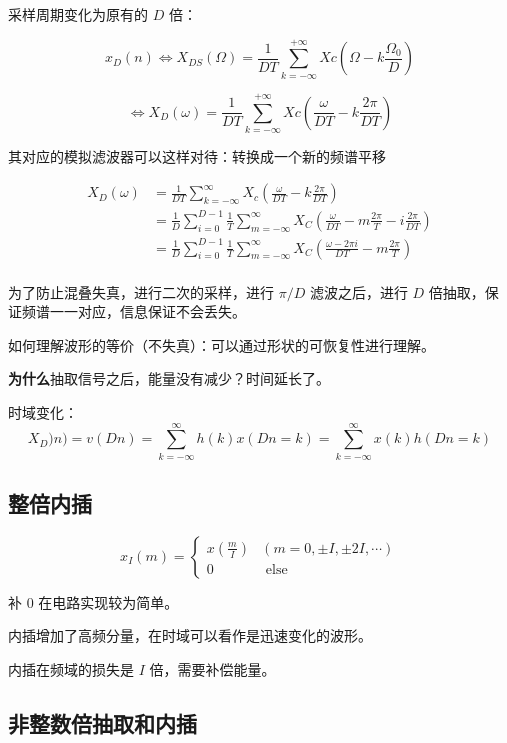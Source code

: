 \documentclass[cn,11pt,chinese,black,simple]{../elegantbook}
\begin{document}
采样周期变化为原有的 \(D\) 倍：

\[x_{D}(n) \Leftrightarrow X_{D S}(\Omega)=\frac{1}{D T} \sum_{k=-\infty}^{+\infty} X c\left(\Omega-k \frac{\Omega_{0}}{D}\right) \] 

\[\Leftrightarrow X_{D}(\omega)=\frac{1}{D T} \sum_{k=-\infty}^{+\infty} X c\left(\frac{\omega}{D T}-k \frac{2 \pi}{D T}\right)\] 

其对应的模拟滤波器可以这样对待：转换成一个新的频谱平移 

\[\begin{aligned}
    X_D(\omega) &= \frac{1}{DT} \sum_{k = -\infty}^\infty X_c(\frac{\omega}{DT} - k \frac{2\pi}{DT}) \\ 
    &= \frac{1}{D} \sum_{i = 0}^{D-1} \frac{1}{T} \sum_{m=-\infty}^\infty X_C (\frac{\omega}{DT} - m \frac{2\pi}{T} - i \frac{2 \pi}{DT}) \\ 
    &= \frac{1}{D} \sum_{i = 0}^{D-1} \frac{1}{T} \sum_{m=-\infty}^\infty X_C (\frac{\omega - 2 \pi i}{DT} - m \frac{2\pi}{T}) \\ 
\end{aligned}\]

为了防止混叠失真，进行二次的采样，进行 \(\pi/D\) 滤波之后，进行 \(D\) 倍抽取，保证频谱一一对应，信息保证不会丢失。

如何理解波形的等价（不失真）：可以通过形状的可恢复性进行理解。

\textbf{为什么}抽取信号之后，能量没有减少？时间延长了。

时域变化：  \[X_D)n) = v (D n) = \sum_{k=-\infty}^\infty h(k) x(Dn = k) = \sum_{k=-\infty}^\infty x(k) h(Dn = k)\]

\subsection{整倍内插}

\[x_{I}(m)=\left\{\begin{array}{cc}
    x\left(\frac{m}{I}\right) & (m=0, \pm I, \pm 2 I, \cdots) \\
    0 & \text { else }
\end{array}\right.\]

补 0 在电路实现较为简单。

内插增加了高频分量，在时域可以看作是迅速变化的波形。

内插在频域的损失是 \(I\) 倍，需要补偿能量。

\subsection{非整数倍抽取和内插}
\end{document}

